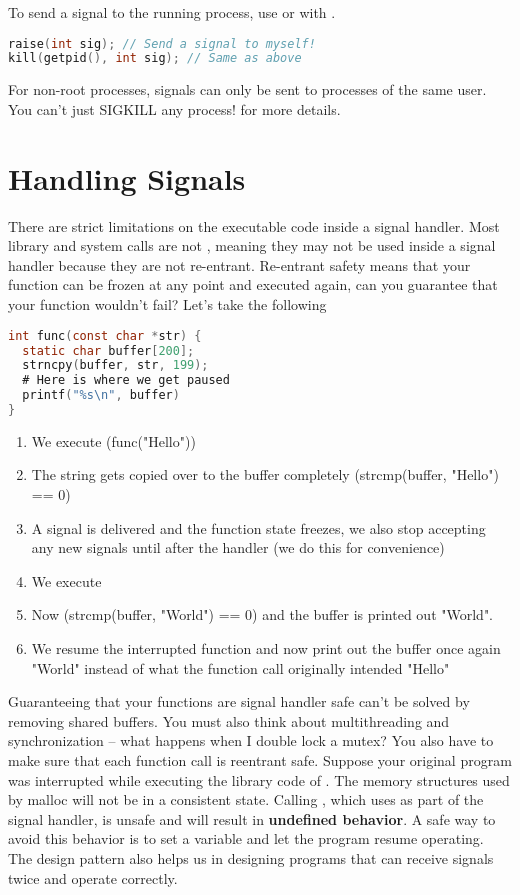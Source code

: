 To send a signal to the running process, use  or  with .

\begin{lstlisting}[language=C]
raise(int sig); // Send a signal to myself!
kill(getpid(), int sig); // Same as above
\end{lstlisting}

For non-root processes, signals can only be sent to processes of the same user.
You can't just SIGKILL any process!
 for more details.

\section{Handling Signals}

There are strict limitations on the executable code inside a \gls{signal handler}.
Most library and system calls are not , meaning they may not be used inside a signal handler because they are not re-entrant.
Re-entrant safety means that your function can be frozen at any point and executed again, can you guarantee that your function wouldn't fail?
Let's take the following

\begin{lstlisting}[language=C]
int func(const char *str) {
  static char buffer[200];
  strncpy(buffer, str, 199);
  # Here is where we get paused
  printf("%s\n", buffer)
}
\end{lstlisting}

\begin{enumerate}
\item We execute \keyword(func("Hello"))
\item The string gets copied over to the buffer completely (strcmp(buffer, "Hello") == 0)
\item A signal is delivered and the function state freezes, we also stop accepting any new signals until after the handler (we do this for convenience)
\item We execute 
\item Now (strcmp(buffer, "World") == 0) and the buffer is printed out "World".
\item We resume the interrupted function and now print out the buffer once again "World" instead of what the function call originally intended "Hello"
\end{enumerate}

Guaranteeing that your functions are signal handler safe can't be solved by removing shared buffers.
You must also think about multithreading and synchronization -- what happens when I double lock a mutex?
You also have to make sure that each function call is reentrant safe.
Suppose your original program was interrupted while executing the library code of .
The memory structures used by malloc will not be in a consistent state.
Calling , which uses  as part of the signal handler, is unsafe and will result in \textbf{undefined behavior}.
A safe way to avoid this behavior is to set a variable and let the program resume operating.
The design pattern also helps us in designing programs that can receive signals twice and operate correctly.

